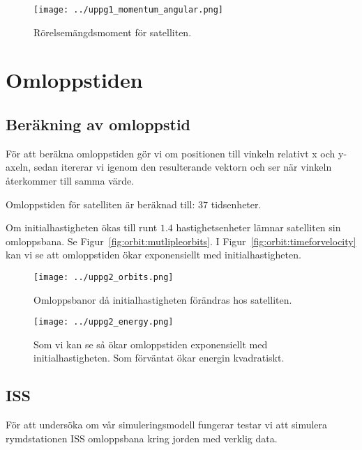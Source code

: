 \documentclass[a4]{article}
\begin{document}
\begin{figure}
\begin{center}
	\texttt{[image: ../uppg1\_momentum\_angular.png]}
\end{center}
\caption{Rörelsemängdsmoment för satelliten.}
\label{fig:satellite:angularmomentum}
\end{figure}


\section{Omloppstiden}
	\subsection{Beräkning av omloppstid}
För att beräkna omloppstiden gör vi om positionen till vinkeln relativt x och
y-axeln, sedan itererar vi igenom den resulterande vektorn och ser när vinkeln
återkommer till samma värde.

Omloppstiden för satelliten är beräknad till: $37$ tidsenheter.

Om initialhastigheten ökas till runt $1.4$ hastighetsenheter lämnar satelliten sin omloppsbana.
Se Figur~\vref{fig:orbit:mutlipleorbits}.
I Figur~\vref{fig:orbit:timeforvelocity} kan vi se att omloppstiden ökar exponensiellt
med initialhastigheten.

\begin{figure}
\begin{center}
	\texttt{[image: ../uppg2\_orbits.png]}
\end{center}
\caption{
Omloppsbanor då initialhastigheten förändras hos satelliten.
}
\label{fig:orbit:mutlipleorbits}
\end{figure}

\begin{figure}
\begin{center}
	\texttt{[image: ../uppg2\_energy.png]}
\end{center}
\caption{
Som vi kan se så ökar omloppstiden exponensiellt med initialhastigheten.
Som förväntat ökar energin kvadratiskt.
}
\label{fig:orbit:timeforvelocity}
\end{figure}

	\subsection{ISS}
För att undersöka om vår simuleringsmodell fungerar testar vi att simulera
rymdstationen ISS omloppsbana kring jorden med verklig data.
\end{document}
